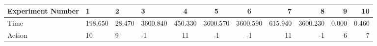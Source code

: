 \documentclass[8pt]{article}
\begin{document}
\begin{landscape}
\begin{tabular}{ | l | l | l | l | c | c | c | r | r | r | r | }
 \hline 
Experiment Number & 1 & 2 & 3 & 4 & 5 & 6 & 7 & 8 & 9 & 10\\ \hline
Time & 198.650 & 28.470 & 3600.840 & 450.330 & 3600.570 & 3600.590 & 615.940 & 3600.230 & 0.000 & 0.460\\ \hline
Action & 10 & 9 & -1 & 11 & -1 & -1 & 11 & -1 & 6 & 7\\ \hline\end{tabular}
\end{landscape}
\end{document}
